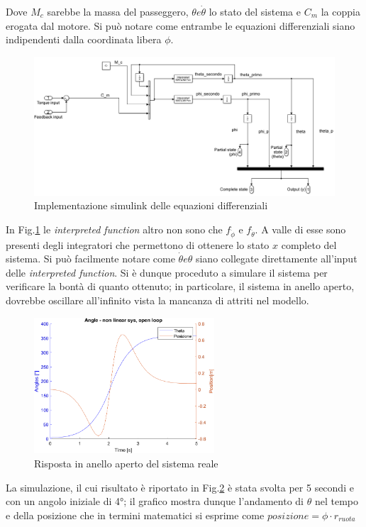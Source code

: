 Dove $M_c$ sarebbe la massa del passeggero, $\theta e \dot{\theta}$ lo stato del sistema e $C_m$  la coppia erogata dal motore. Si può notare come entrambe le equazioni differenziali siano indipendenti dalla coordinata libera $\phi$.
\begin{figure}[H]
	\centering   	
	\includegraphics[width=1\textwidth]{Immagini/non_linear_system.png}
	\caption{Implementazione simulink delle equazioni differenziali}
	\label{fig:non_linear_system}
\end{figure}
In Fig.\ref{fig:non_linear_system} le \textit{interpreted function} altro non sono che  $f_{\ddot{\phi}}$ e $f_{\ddot{\theta}}$. A valle di esse sono presenti degli integratori che permettono di ottenere lo stato $x$ completo del sistema. Si può facilmente notare come $\dot{\theta} e \theta$ siano collegate direttamente all'input delle \textit{interpreted function}.
Si è dunque proceduto a  simulare il sistema per verificare la bontà di quanto ottenuto; in particolare, il sistema in anello aperto, dovrebbe oscillare all'infinito vista la mancanza di attriti nel modello.

\begin{figure}[H]
	\centering   	
	\includegraphics[width=0.6\textwidth]{Immagini/open_loop_response_non_linear.png}
	\caption{Risposta in anello aperto del sistema reale}
	\label{fig:open_loop_response_non_linear}
\end{figure}
La simulazione, il cui risultato è riportato in Fig.\ref{fig:open_loop_response_non_linear} è stata svolta per 5 secondi e con un angolo iniziale di 4°; il grafico mostra dunque l'andamento di $\theta$ nel tempo e della posizione che in termini matematici si esprime come $posizione = \phi \cdot{r_{ruota}}$
\label{sec:simulazione_reale}
